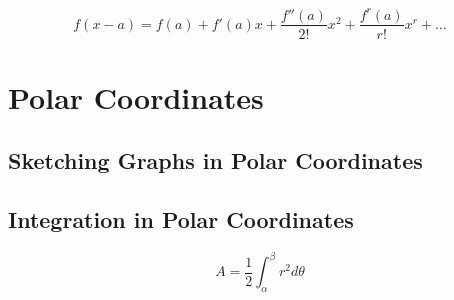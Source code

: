 \documentclass[a4paper,9pt]{scrartcl}
\begin{document}
    \begin{displaymath}
        f(x - a) = f(a) + f'(a)x + \frac{f''(a)}{2!}x^2 + \frac{f^{r}(a)}{r!}x^r + \dots
    \end{displaymath}


    \section{Polar Coordinates}

    \subsection{Sketching Graphs in Polar Coordinates}
%
%

    \subsection{Integration in Polar Coordinates}

    \begin{displaymath}
        A = \frac{1}{2}\int_{\alpha}^{\beta} r^2 d\theta
    \end{displaymath}
\end{document}
